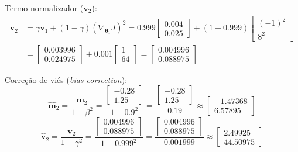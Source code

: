 \documentclass{dlproblemset}
\begin{document}
\begin{enumerate}[1)]
\begin{enumerate}
  Termo normalizador ($\mathbf{v}_2$):
    $$\begin{aligned}\mathbf{v}_{2} &= \gamma \mathbf{v}_{1} + (1-\gamma )(\nabla_{\boldsymbol{\theta}_{1}}J)^2 = 0.999\begin{bmatrix} 0.004\\ 0.025 \end{bmatrix} + (1-0.999)\begin{bmatrix} (-1)^2\\ 8^2 \end{bmatrix} \\ &= \begin{bmatrix} 0.003996\\ 0.024975 \end{bmatrix} + 0.001\begin{bmatrix} 1\\ 64 \end{bmatrix} = \begin{bmatrix} 0.004996\\ 0.088975 \end{bmatrix}\end{aligned}$$

  Correção de viés (\textit{bias correction}):
    $$\hat{\mathbf{m}}_{2} = \frac{\mathbf{m}_{2}}{1 - \beta ^{2}} = \frac{\begin{bmatrix} -0.28\\ 1.25 \end{bmatrix}}{1 - 0.9^2} = \frac{\begin{bmatrix} -0.28\\ 1.25 \end{bmatrix}}{0.19} \approx \begin{bmatrix} -1.47368\\ 6.57895 \end{bmatrix}$$   $$\hat{\mathbf{v}}_{2} = \frac{\mathbf{v}_{2}}{1 - \gamma ^{2}} = \frac{\begin{bmatrix} 0.004996\\ 0.088975 \end{bmatrix}}{1 - 0.999^2} = \frac{\begin{bmatrix} 0.004996\\ 0.088975 \end{bmatrix}}{0.001999} \approx \begin{bmatrix} 2.49925\\ 44.50975 \end{bmatrix}$$


\end{enumerate}
\end{enumerate}
\end{document}
